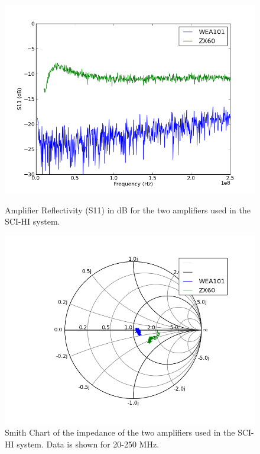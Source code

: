 \begin{figure}[htb]
\centering
\begin{minipage}[b]{0.47\textwidth}
\centering
\includegraphics[width=0.95\linewidth]{SCIHI_system/figures/amp_S11_dB.png}
\caption{Amplifier Reflectivity (S11) in dB for the two amplifiers used in the SCI-HI system.}
\label{Fig:amp_comp_dB}
\end{minipage}%
\begin{minipage}[b]{0.02\textwidth}
\hspace{1cm}
\end{minipage}%
\begin{minipage}[b]{0.47\textwidth}
\centering
\includegraphics[width=0.95\linewidth]{SCIHI_system/figures/amp_S11_Smith.png}
\caption{Smith Chart of the impedance of the two amplifiers used in the SCI-HI system. Data is shown for 20-250 MHz. }
\label{Fig:amp_comp_Smith}
\end{minipage}
\end{figure}

